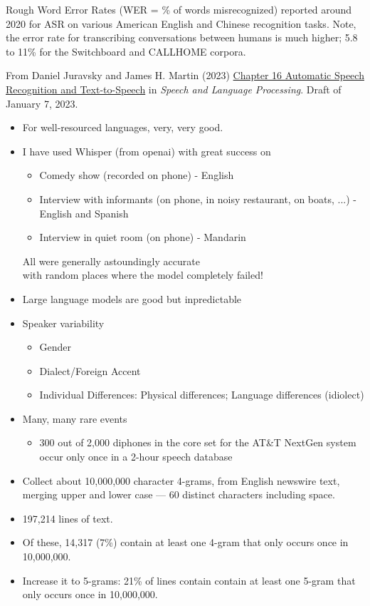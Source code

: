 \documentclass[a4paper,landscape,headrule,footrule,xetex]{foils}
\begin{document}
Rough Word Error Rates (WER = \% of words misrecognized) reported
around 2020 for ASR on various American English and Chinese
recognition tasks.  Note, the error rate for transcribing
conversations between humans is much higher; 5.8 to 11\% for the
Switchboard and CALLHOME corpora.

From Daniel Juravsky and James H. Martin (2023)
\href{https://web.stanford.edu/~jurafsky/slp3/16.pdf}{Chapter 16 Automatic Speech Recognition and Text-to-Speech} in \textit{Speech and Language Processing}. Draft of January 7, 2023.


\begin{itemize}
\item For well-resourced languages, very, very good.
\item I have used Whisper (from openai) with great success on
  \begin{itemize}
  \item Comedy show (recorded on phone) - English
  \item Interview with informants (on phone,  in noisy restaurant, on boats, ...) - English and Spanish
  \item Interview in quiet room (on phone) - Mandarin
  \end{itemize}
  All were generally astoundingly accurate
  \\ with random places where the model completely failed!
\item Large language models are good but inpredictable
\end{itemize}

\begin{itemize}
\item Speaker variability
  \begin{itemize}
  \item Gender
  \item Dialect/Foreign Accent
  \item Individual Differences: Physical differences; Language differences (idiolect)‏
  \end{itemize}
\item Many, many rare events
  \begin{itemize}
  \item 300 out of 2,000 diphones in the core set for the AT\&T NextGen system occur only once in a 2-hour speech database
  \end{itemize}
\end{itemize}
\begin{itemize}
\item Collect about 10,000,000 character 4-grams, from English
  newswire text, merging upper and lower case — 60 distinct characters
  including space.
\item 197,214 lines of text.
\item Of these, 14,317 (7\%) contain at least one 4-gram that only occurs once in 10,000,000.
\item Increase it to 5-grams: 21\% of lines contain contain at least
  one 5-gram that only occurs once in 10,000,000.
\end{itemize}
\end{document}
